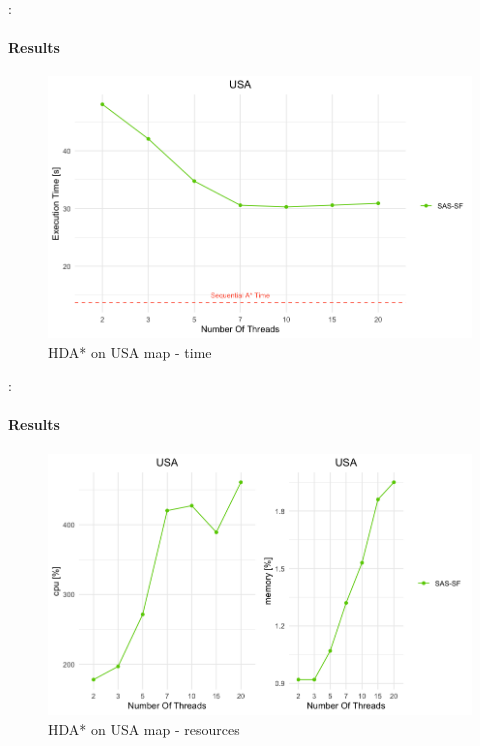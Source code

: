 \documentclass[12pt]{beamer}
\begin{document}
	\begin{frame}{\secname : \subsecname}
		\framesubtitle{Results}
		\begin{figure}[ht!]
			\centering
			\includegraphics[width=0.8\linewidth]{hda/usatime.png}
			\caption{HDA* on USA map - time}
		\end{figure}
	\end{frame}
	\begin{frame}{\secname : \subsecname}
		\framesubtitle{Results}
		\begin{figure}[ht!]
			\centering
			\includegraphics[width=0.8\linewidth]{hda/usacpumem.png}
			\caption{HDA* on USA map - resources}
		\end{figure}
	\end{frame}
\end{document}
